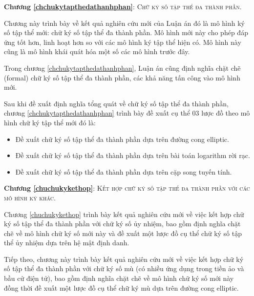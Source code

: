 \textbf{Chương \ref{chchukytapthedathanhphan}}: \textsc{Chữ ký số tập thể đa thành phần}.

Chương này trình bày về kết quả nghiên cứu mới của Luận án đó là mô hình ký số tập thể mới: chữ ký số tập thể đa thành phần. Mô hình mới này cho phép đáp ứng tốt hơn, linh hoạt hơn so với các mô hình ký tập thể hiện có. Mô hình này cũng là mô hình khái quát hóa một số các mô hình trước đây.

Trong chương \ref{chchukytapthedathanhphan}, Luận án cũng định nghĩa chặt chẽ (formal) chữ ký số tập thể đa thành phần, các khả năng tấn công vào mô hình mới.

Sau khi đề xuất định nghĩa tổng quát về chữ ký số tập thể đa thành phần, chương \ref{chchukytapthedathanhphan} trình bày đề xuất cụ thể 03 lược đồ theo mô hình chữ ký tập thể mới đó là:
\begin{itemize}
	\item Đề xuất chữ ký số tập thể đa thành phần dựa trên đường cong elliptic.
	\item Đề xuất chữ ký số tập thể đa thành phần dựa trên bài toán logarithm rời rạc.
	\item Đề xuất chữ ký số tập thể đa thành phần dựa trên cặp song tuyến tính.
\end{itemize}

\textbf{Chương \ref{chuchukykethop}}: \textsc{Kết hợp chữ ký số tập thể đa thành phần với các mô hình ký khác}.

Chương \ref{chuchukykethop} trình bày kết quả nghiên cứu mới về việc kết hợp chữ ký số tập thể đa thành phần với chữ ký số ủy nhiệm, bao gồm định nghĩa chặt chẽ về mô hình chữ ký số mới này và đề xuất một lược đồ cụ thể chữ ký số tập thể ủy nhiệm dựa trên hệ mật định danh.

Tiếp theo, chương này trình bày kết quả nghiên cứu mới về việc kết hợp chữ ký số tập thể đa thành phần với chữ ký số mù (có nhiều ứng dụng trong tiền ảo và bầu cử điện tử), bao gồm định nghĩa chặt chẽ về mô hình chữ ký số mới này đồng thời đề xuất một lược đồ cụ thể chữ ký mù dựa trên đường cong elliptic.